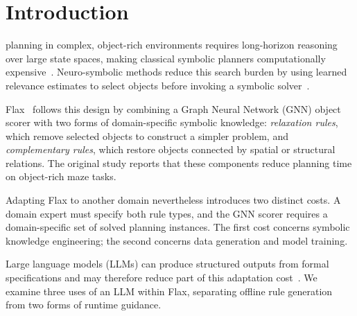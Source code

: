 \documentclass{ieeeaccess}
\begin{document}
\maketitle

\section{Introduction}
 planning in complex, object-rich environments requires long-horizon reasoning over large state spaces, making classical symbolic planners computationally expensive~\cite{helmert2006fast,edelkamp2004pddl2}.
Neuro-symbolic methods reduce this search burden by using learned relevance estimates to select objects before invoking a symbolic solver~\cite{silver2021planning,chen2024graph}.

Flax~\cite{du2026fast} follows this design by combining a Graph Neural Network (GNN) object scorer with two forms of domain-specific symbolic knowledge: \emph{relaxation rules}, which remove selected objects to construct a simpler problem, and \emph{complementary rules}, which restore objects connected by spatial or structural relations.
The original study reports that these components reduce planning time on object-rich maze tasks.

Adapting Flax to another domain nevertheless introduces two distinct costs.
A domain expert must specify both rule types, and the GNN scorer requires a domain-specific set of solved planning instances.
The first cost concerns symbolic knowledge engineering; the second concerns data generation and model training.

Large language models (LLMs) can produce structured outputs from formal specifications and may therefore reduce part of this adaptation cost~\cite{brown2020language,wei2022chain}.
We examine three uses of an LLM within Flax, separating offline rule generation from two forms of runtime guidance.
\end{document}
